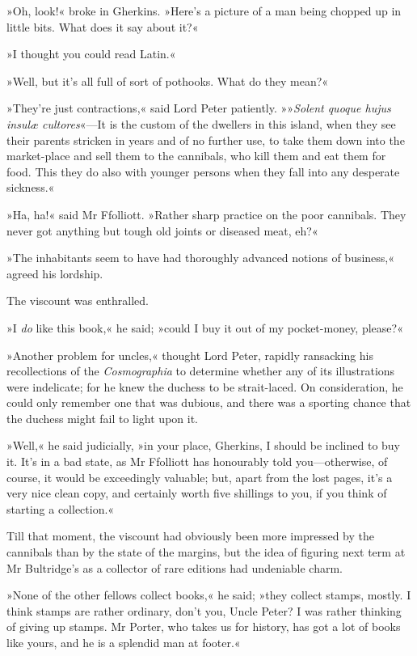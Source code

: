 »Oh, look!« broke in Gherkins. »Here's a picture of a man being chopped up in little bits. What does it say about it?«

»I thought you could read Latin.«

»Well, but it's all full of sort of pothooks. What do they mean?«

»They're just contractions,« said Lord Peter patiently. »»\textit{Solent quoque hujus insulæ cultores}«—It is the custom of the dwellers in this island, when they see their parents stricken in years and of no further use, to take them down into the market-place and sell them to the cannibals, who kill them and eat them for food. This they do also with younger persons when they fall into any desperate sickness.«

»Ha, ha!« said Mr Ffolliott. »Rather sharp practice on the poor cannibals. They never got anything but tough old joints or diseased meat, eh?«

»The inhabitants seem to have had thoroughly advanced notions of business,« agreed his lordship.

The viscount was enthralled.

»I \textit{do} like this book,« he said; »could I buy it out of my pocket-money, please?«

»Another problem for uncles,« thought Lord Peter, rapidly ransacking his recollections of the \textit{Cosmographia} to determine whether any of its illustrations were indelicate; for he knew the duchess to be strait-laced. On consideration, he could only remember one that was dubious, and there was a sporting chance that the duchess might fail to light upon it.

»Well,« he said judicially, »in your place, Gherkins, I should be inclined to buy it. It's in a bad state, as Mr Ffolliott has honourably told you—otherwise, of course, it would be exceedingly valuable; but, apart from the lost pages, it's a very nice clean copy, and certainly worth five shillings to you, if you think of starting a collection.«

Till that moment, the viscount had obviously been more impressed by the cannibals than by the state of the margins, but the idea of figuring next term at Mr Bultridge's as a collector of rare editions had undeniable charm.

»None of the other fellows collect books,« he said; »they collect stamps, mostly. I think stamps are rather ordinary, don't you, Uncle Peter? I was rather thinking of giving up stamps. Mr Porter, who takes us for history, has got a lot of books like yours, and he is a splendid man at footer.«

